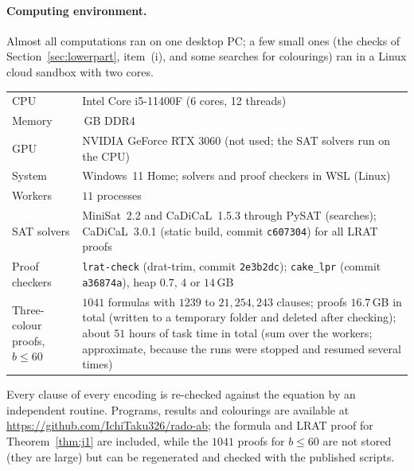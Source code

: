 \documentclass[11pt,a4paper]{article}
\theoremstyle{definition}
\theoremstyle{remark}
\begin{document}
\paragraph{Computing environment.} Almost all computations ran on one desktop PC; a few small ones (the checks of Section~\ref{sec:lowerpart}, item~(i), and some searches for colourings) ran in a Linux cloud sandbox with two cores.
\begin{center}
\small
\renewcommand{\arraystretch}{1.12}
\begin{tabular}{>{\raggedright}p{3.6cm}>{\raggedright\arraybackslash}p{10cm}}
\toprule
CPU & Intel Core i5-11400F (6 cores, 12 threads)\\
Memory & 32\,GB DDR4\\
GPU & NVIDIA GeForce RTX 3060 (not used; the SAT solvers run on the CPU)\\
System & Windows~11 Home; solvers and proof checkers in WSL (Linux)\\
Workers & $11$ processes\\
SAT solvers & MiniSat~2.2 and CaDiCaL~1.5.3 through PySAT (searches); CaDiCaL~3.0.1 (static build, commit \texttt{c607304}) for all LRAT proofs\\
Proof checkers & \texttt{lrat-check} (drat-trim, commit \texttt{2e3b2dc}); \texttt{cake\_lpr} (commit \texttt{a36874a}), heap $0.7$, $4$ or $14$\,GB\\
\midrule
Three-colour proofs, $b\le60$ & $1041$ formulas with $1239$ to $21{,}254{,}243$ clauses; proofs $16.7$\,GB in total (written to a temporary folder and deleted after checking); about $51$ hours of task time in total (sum over the workers; approximate, because the runs were stopped and resumed several times)\\
\bottomrule
\end{tabular}
\end{center}
Every clause of every encoding is re-checked against the equation by an independent routine. Programs, results and colourings are available at \url{https://github.com/IchiTaku326/rado-ab}; the formula and LRAT proof for Theorem~\ref{thm:j1} are included, while the $1041$ proofs for $b\le60$ are not stored (they are large) but can be regenerated and checked with the published scripts.

\clearpage
\end{document}
